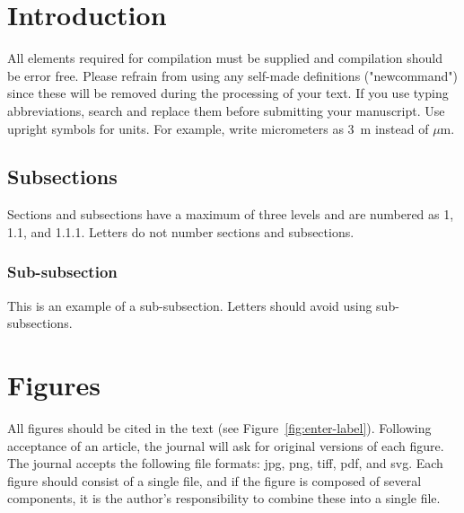 \documentclass[article,review]{planetary}
\begin{document}
\license{}

\newpage

\section{Introduction}

All elements required for compilation must be supplied and compilation should be error free. Please refrain from using any self-made definitions ("newcommand") since these will be removed during the processing of your text. If you use typing abbreviations, search and replace them before submitting your manuscript. Use upright symbols for units. For example, write micrometers as 3~\upmu m instead of $\mu$m.

\subsection{Subsections}

Sections and subsections have a maximum of three levels and are numbered as 1, 1.1, and 1.1.1. Letters do not number sections and subsections.


\subsubsection{Sub-subsection}

This is an example of a sub-subsection. Letters should avoid using sub-subsections.

\section{Figures}
All figures should be cited in the text (see Figure~\ref{fig:enter-label}). Following acceptance of an article, the journal will ask for original versions of each figure. The journal accepts the following file formats: jpg, png, tiff, pdf, and svg. Each figure should consist of a single file, and if the figure is composed of several components, it is the author's responsibility to combine these into a single file.
\end{document}
